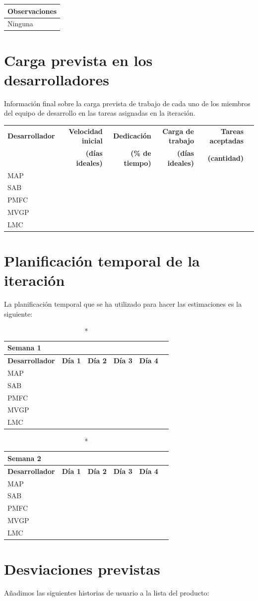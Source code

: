 \documentclass[11pt]{article}
\begin{document}
\begin{longtable}{p{1.028\linewidth}}
	\textbf{Observaciones}\\
	\midrule
	Ninguna\\
	\bottomrule
	\bottomrule
\end{longtable}

\section{Carga prevista en los desarrolladores}

Información final sobre la carga prevista de trabajo de cada uno de los miembros del equipo de desarrollo en las tareas asignadas en la iteración.

\begin{longtable}{lrrrrr}
  \toprule
  \textbf{Desarrollador} & \textbf{Velocidad inicial} & \textbf{Dedicación} & \textbf{Carga de trabajo} & \textbf{Tareas aceptadas} \\
  & \textbf{(días ideales)} & \textbf{(\% de tiempo)} & \textbf{(días ideales)} & \textbf{ (cantidad)}\\
  \midrule
  MAP &  & \\
  SAB &  & \\
  PMFC \\
  MVGP & & \\
  LMC \\
  \bottomrule
\end{longtable}

\section{Planificación temporal de la iteración}
La planificación temporal que se ha utilizado para hacer las estimaciones es la siguiente:


\begin{longtable}{lrrrrr}
  \caption*{Semana 1}\\
  \toprule
  \textbf{Desarrollador} & \textbf{Día 1} & \textbf{Día 2} & \textbf{Día 3} & \textbf{Día 4} \\
  \midrule
  MAP &  & \\
  SAB &  & \\
  PMFC \\
  MVGP & & \\
  LMC \\
  \bottomrule
\end{longtable}

\begin{longtable}{lrrrrr}
  \caption*{Semana 2}\\
  \toprule
  \textbf{Desarrollador} & \textbf{Día 1} & \textbf{Día 2} & \textbf{Día 3} & \textbf{Día 4} \\
  \midrule
  MAP &  & \\
  SAB &  & \\
  PMFC \\
  MVGP & & \\
  LMC \\
  \bottomrule
\end{longtable}

\section{Desviaciones previstas}

Añadimos las siguientes historias de usuario a la lista del producto:
\end{document}
